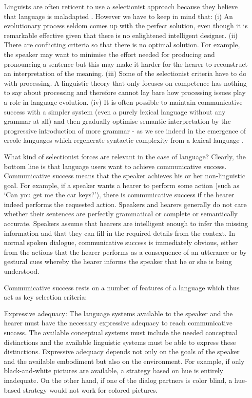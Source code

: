 Linguists are often reticent to use a selectionist approach because they believe that language is 
maladapted \citep{Boeckx:2005}. However we have to keep in mind that: (i) An evolutionary process 
seldom comes up with the perfect solution, even though it is remarkable effective given that there is no 
enlightened intelligent designer. (ii) There are conflicting criteria so that there is no optimal solution. 
For example, the speaker may want to minimise the effort needed for producing and pronouncing a sentence but this 
may make it harder for the hearer to reconstruct an interpretation of the meaning. (iii) Some of the selectionist 
criteria have to do with processing. A linguistic theory that only focuses on competence has nothing to say about 
processing and therefore cannot lay bare how processing issues play a role in language evolution. (iv) It is often possible 
to maintain communicative success with a simpler system (even a purely lexical language without any grammar at all) and then 
gradually optimise semantic interpretation by the progressive introduction of more grammar - as we see indeed 
in the emergence of creole languages which regenerate syntactic complexity from 
a lexical language \citep{Mufwene:2001}. 

What kind of selectionist forces are relevant in the case of language? 
Clearly, the bottom line is that language users want to achieve {\bfshape communicative success}. 
Communicative success means that the speaker achieves his or her non-linguistic goal. For example, if a speaker
wants a hearer to perform some action (such as `Can you get me the car keys?'), there is communicative success if 
the hearer indeed performs the requested action. Speakers and hearers generally do not care whether their sentences
are perfectly grammatical or complete or semantically accurate. Speakers assume that hearers are intelligent enough
to infer the missing information and that they can fill in the required details from the context. 
In normal spoken dialogue, communicative success is immediately obvious, either 
from the actions that the hearer performs as a consequence of an utterance or by gestural cues whereby 
the hearer informs the speaker that he or she is being understood. 

Communicative success rests on a number of features of a language which thus act as key 
selection criteria: 

{\bfshape Expressive adequacy}: The language systems available to the speaker and the hearer must have 
the necessary expressive adequacy to reach communicative success. 
The available conceptual systems must include the needed conceptual distinctions 
and the available linguistic systems must be able to express these distinctions. Expressive adequacy depends 
not only on the goals of the speaker and the available embodiment but also on the environment. For example, 
if only black-and-white pictures are available, a strategy based on hue is entirely inadequate. On the other hand, 
if one of the dialog partners is color blind, a hue-based strategy would not work for colored pictures. 

